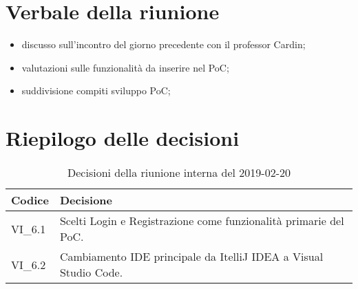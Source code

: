 \section{Verbale della riunione}
\begin{itemize}
	\item discusso sull'incontro del giorno precedente con il professor Cardin;
	\item valutazioni sulle funzionalità da inserire nel PoC;
	\item suddivisione compiti sviluppo PoC;
\end{itemize}

\hspace{3cm}

\section{Riepilogo delle decisioni}

	
	\begin{longtable}{ >{\centering}p{} >{}p{}}
		\caption{Decisioni della riunione interna del 2019-02-20}\\	
		\rowcolorhead
		\textbf{\color{white}Codice} 
		& \centering\textbf{\color{white}Decisione} 
		\tabularnewline 
		\endfirsthead
		VI\_6.1 & Scelti Login e Registrazione come funzionalità primarie del 
		PoC.
		
		\tabularnewline 
		VI\_6.2 & Cambiamento IDE principale da ItelliJ IDEA a Visual Studio 
		Code.
		
		
		
		
	\end{longtable}
	




